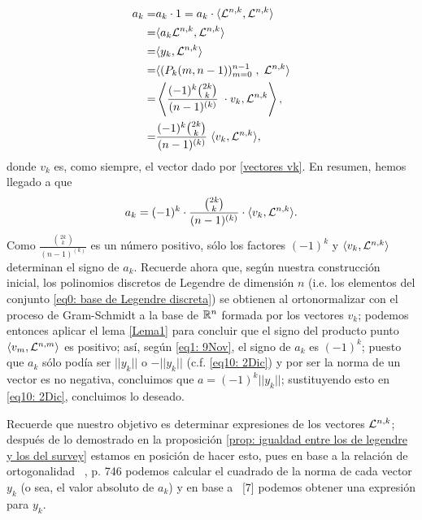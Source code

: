 \begin{align*}
a_{k}= & a_{k} \cdot 1 = 
a_{k} 
\cdot  \langle  \mathcal{L}^{n,k} , \mathcal{L}^{n,k} \rangle \\
= & \langle a_{k} \mathcal{L}^{n,k} , \mathcal{L}^{n,k} \rangle \\
= & \langle y_{k} , \mathcal{L}^{n,k} \rangle \\
= & \langle (P_{k}(m, n-1))_{m=0}^{n-1} 
\hspace{0.1cm}, \hspace{0.1cm} \mathcal{L}^{n,k} \rangle \\
= &
\left\langle
\frac{(-1)^{k}\binom{2k}{k}}{(n-1)^{(k)}} \hspace{0.1cm} \cdot
v_{k} , \mathcal{L}^{n,k}
\right\rangle, \\
= & \frac{(-1)^{k}\binom{2k}{k}}{(n-1)^{(k)}} \hspace{0.1cm}
\langle v_{k} , \mathcal{L}^{n,k} \rangle ,
\end{align*}
donde $v_{k}$ es,
como siempre, el vector 
dado por \eqref{vectores vk}.
En resumen, hemos llegado a que
\begin{equation}
\label{eq1: 9Nov}
a_{k}= (-1)^{k}\cdot 
\frac{\binom{2k}{k}}{(n-1)^{(k)}}\cdot 
\langle v_{k} , \mathcal{L}^{n,k}
\rangle.
\end{equation}
Como $\frac{\binom{2k}{k}}{(n-1)^{(k)}}$
es un número positivo, sólo los factores $(-1)^{k}$ y 
$\langle v_{k} , \mathcal{L}^{n,k} \rangle$
determinan el signo de $a_{k}$.
\noindent 
Recuerde ahora que,
según nuestra construcción inicial,
los polinomios discretos de Legendre
de dimensión $n$ (i.e.
los elementos del conjunto 
\eqref{eq0: base de Legendre discreta}) 
se obtienen 
al ortonormalizar con el proceso
de Gram-Schmidt a la base 
de $\mathbb{R}^{n}$ formada por
los vectores $v_{k}$; 
podemos entonces aplicar el lema \ref{Lema1} para 
concluir que el signo del producto punto 
$\langle v_{m} , \mathcal{L}^{n,m} \rangle$
es positivo; así,
según \eqref{eq1: 9Nov},
el signo de $a_{k}$ 
es $(-1)^{k}$;
puesto que $a_{k}$ sólo podía ser
$||y_{k}||$ o $-||y_{k}||$ 
(c.f. \eqref{eq10: 2Dic})
y por ser la norma
de un vector es no negativa, concluimos que
$a=(-1)^{k}||y_{k}||$; sustituyendo esto en
\eqref{eq10: 2Dic},
concluimos lo deseado.
\\
\QEDB
\vspace{0.2cm}


\noindent 

Recuerde que nuestro objetivo es determinar expresiones
de los vectores $\mathcal{L}^{n,k}$; 
después de lo demostrado en 
la proposición
\ref{prop: igualdad entre los de legendre y los del survey}
estamos en posición de hacer esto, pues
en base a la relación de ortogonalidad 
~\cite{Neuman}, p. 746
podemos calcular el cuadrado
de la norma de cada vector $y_{k}$ (o sea,
el valor absoluto de $a_{k}$)
y  en base a 
~\cite{Neuman}[7]
podemos
obtener una expresión para $y_{k}$.

